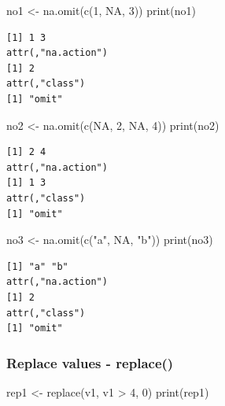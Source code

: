 \documentclass[
  letterpaper,
  DIV=11,
  numbers=noendperiod]{scrartcl}
\newenvironment{Shaded}{\begin{snugshade}}{\end{snugshade}}
\newcommand{\ConstantTok}[1]{\textcolor[rgb]{0.56,0.35,0.01}{#1}}
\newcommand{\DecValTok}[1]{\textcolor[rgb]{0.68,0.00,0.00}{#1}}
\newcommand{\FunctionTok}[1]{\textcolor[rgb]{0.28,0.35,0.67}{#1}}
\newcommand{\NormalTok}[1]{\textcolor[rgb]{0.00,0.23,0.31}{#1}}
\newcommand{\OtherTok}[1]{\textcolor[rgb]{0.00,0.23,0.31}{#1}}
\newcommand{\SpecialCharTok}[1]{\textcolor[rgb]{0.37,0.37,0.37}{#1}}
\newcommand{\StringTok}[1]{\textcolor[rgb]{0.13,0.47,0.30}{#1}}
\begin{document}
\begin{Shaded}
\begin{Highlighting}[]
\NormalTok{no1 }\OtherTok{\textless{}{-}} \FunctionTok{na.omit}\NormalTok{(}\FunctionTok{c}\NormalTok{(}\DecValTok{1}\NormalTok{, }\ConstantTok{NA}\NormalTok{, }\DecValTok{3}\NormalTok{))}
\FunctionTok{print}\NormalTok{(no1)}
\end{Highlighting}
\end{Shaded}

\begin{verbatim}
[1] 1 3
attr(,"na.action")
[1] 2
attr(,"class")
[1] "omit"
\end{verbatim}

\begin{Shaded}
\begin{Highlighting}[]
\NormalTok{no2 }\OtherTok{\textless{}{-}} \FunctionTok{na.omit}\NormalTok{(}\FunctionTok{c}\NormalTok{(}\ConstantTok{NA}\NormalTok{, }\DecValTok{2}\NormalTok{, }\ConstantTok{NA}\NormalTok{, }\DecValTok{4}\NormalTok{))}
\FunctionTok{print}\NormalTok{(no2)}
\end{Highlighting}
\end{Shaded}

\begin{verbatim}
[1] 2 4
attr(,"na.action")
[1] 1 3
attr(,"class")
[1] "omit"
\end{verbatim}

\begin{Shaded}
\begin{Highlighting}[]
\NormalTok{no3 }\OtherTok{\textless{}{-}} \FunctionTok{na.omit}\NormalTok{(}\FunctionTok{c}\NormalTok{(}\StringTok{"a"}\NormalTok{, }\ConstantTok{NA}\NormalTok{, }\StringTok{"b"}\NormalTok{))}
\FunctionTok{print}\NormalTok{(no3)}
\end{Highlighting}
\end{Shaded}

\begin{verbatim}
[1] "a" "b"
attr(,"na.action")
[1] 2
attr(,"class")
[1] "omit"
\end{verbatim}

\subsubsection{Replace values -
replace()}\label{replace-values---replace}

\begin{Shaded}
\begin{Highlighting}[]
\NormalTok{rep1 }\OtherTok{\textless{}{-}} \FunctionTok{replace}\NormalTok{(v1, v1 }\SpecialCharTok{\textgreater{}} \DecValTok{4}\NormalTok{, }\DecValTok{0}\NormalTok{)}
\FunctionTok{print}\NormalTok{(rep1)}
\end{Highlighting}
\end{Shaded}
\end{document}
